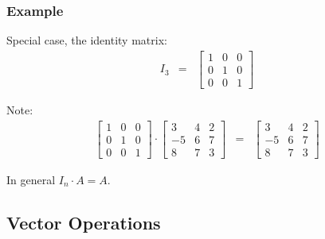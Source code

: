 \begin{frame}
  \frametitle{Example}

  Special case, the identity matrix:
  \begin{eqnarray*}
    I_3 & = & 
    \left[
      \begin{array}{rrr}
        1 & 0 & 0\\
        0 & 1 & 0 \\
        0 & 0 & 1
      \end{array}
    \right]
  \end{eqnarray*}

  Note:
  \begin{eqnarray*}
    \left[
      \begin{array}{rrr}
        1 & 0 & 0 \\
        0 & 1 & 0 \\
        0 & 0 & 1
      \end{array}
    \right] \cdot
       \left[
      \begin{array}{rrr}
        3 & 4 & 2 \\
        -5 & 6 & 7 \\
        8 & 7 & 3
      \end{array}
    \right] & = & 
       \left[
      \begin{array}{rrr}
        3 & 4 & 2 \\
        -5 & 6 & 7 \\
        8 & 7 & 3
      \end{array}
    \right] 
  \end{eqnarray*}

  In general $I_n\cdot A = A$.

\end{frame}


\subsection{Vector Operations}


